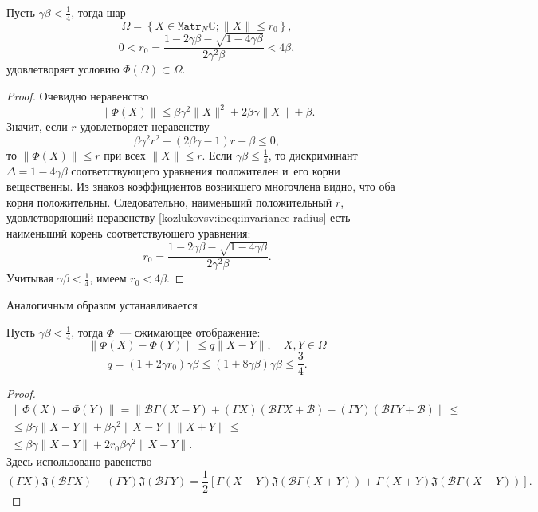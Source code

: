\begin{lem}
    Пусть \( \gamma\beta < \frac14\),
    тогда шар
    \[
        \Omega = \left\{ X\in \mathtt{Matr}_N\mathbb{C}; \|X\| \leq r_0 \right\}, \]
    \[  0 < r_0 = \frac{1 - 2\gamma\beta - \sqrt{1-4\gamma\beta}}{2\gamma^2\beta} < 4\beta, \]
    удовлетворяет условию \( \Phi(\Omega)\subset\Omega \).
\end{lem}
\begin{proof}
Очевидно неравенство
    \[ \| \Phi(X) \| \leq
     \beta \gamma^2 \|X\|^2 + 2\beta\gamma\|X\| + \beta. \]
Значит, если \( r \) удовлетворяет неравенству
    \begin{equation}\label{kozlukovsv:ineq:invariance-radius}
        \beta \gamma^2 r^2 + (2\beta\gamma - 1)r + \beta \leq 0,
    \end{equation}
    то \( \|\Phi(X)\| \leq r \) при всех \( \|X\| \leq r \).
Если \( \gamma\beta \leq \frac14 \),
    то дискриминант \( \Delta = 1-4\gamma\beta \)
    соответствующего уравнения положителен и~его корни вещественны.
Из знаков коэффициентов возникшего многочлена видно, что оба корня положительны.
Следовательно, наименьший положительный \( r \),
    удовлетворяющий неравенству \eqref{kozlukovsv:ineq:invariance-radius}
    есть наименьший корень
    соответствующего уравнения:
    \[ r_0 = \frac{1 - 2\gamma\beta - \sqrt{1-4\gamma\beta}}{2\gamma^2\beta}. \]
Учитывая \( \gamma\beta<\frac14 \), имеем \( r_0 < 4\beta \).
\end{proof}

Аналогичным образом устанавливается
\begin{lem}
    Пусть \(\gamma\beta<\frac14\),
    тогда \( \Phi \)~--- сжимающее отображение:
    \[ \| \Phi(X) - \Phi(Y) \| \leq q \|X - Y\|, \quad X,Y\in\Omega \]
    \[ q = (1+2\gamma r_0) \gamma\beta \leq (1+8\gamma\beta)\gamma\beta \leq \frac34. \]
\end{lem}
\begin{proof}
    \begin{align*} \| \Phi(X) - \Phi(Y) \| = \| \mathcal{B}\Gamma (X-Y) + (\Gamma X)(\mathcal{B}\Gamma X + \mathcal{B})
     - (\Gamma Y)(\mathcal{B} \Gamma Y + \mathcal{B}) \| \leq \\
        \leq
     \beta\gamma\|X-Y\| +
     \beta \gamma^2 \|X-Y\| \|X+Y\| \leq \\
        \leq
     \beta\gamma\|X-Y\| +
     2 r_0 \beta \gamma^2 \|X-Y\|.
    \end{align*}
Здесь использовано равенство
\[ (\Gamma X) \mathfrak{J}(\mathcal{B}\Gamma X) - (\Gamma Y) \mathfrak{J}(\mathcal{B}\Gamma Y) =
    \frac12\left[
        \Gamma(X-Y) \mathfrak{J}(\mathcal{B}\Gamma(X+Y))
    +   \Gamma(X+Y) \mathfrak{J}(\mathcal{B}\Gamma(X-Y))
    \right]. \]
\end{proof}

